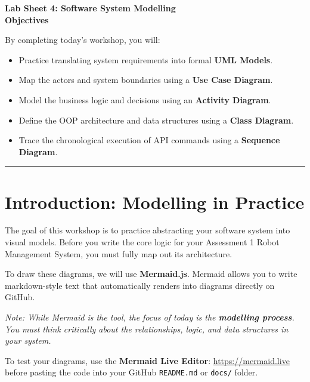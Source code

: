 \documentclass[a4paper,12pt]{article}
\begin{document}

\begin{center}
    \LARGE \textbf{Lab Sheet 4: Software System Modelling} \\
    \vspace{0.5cm}
    \large \textbf{Objectives}
\end{center}

\noindent By completing today's workshop, you will:
\begin{itemize}
    \item Practice translating system requirements into formal \textbf{UML Models}.
    \item Map the actors and system boundaries using a \textbf{Use Case Diagram}.
    \item Model the business logic and decisions using an \textbf{Activity Diagram}.
    \item Define the OOP architecture and data structures using a \textbf{Class Diagram}.
    \item Trace the chronological execution of API commands using a \textbf{Sequence Diagram}.
\end{itemize}

\vspace{0.5cm}
\hrule
\vspace{0.5cm}

\section*{Introduction: Modelling in Practice}
The goal of this workshop is to practice abstracting your software system into visual models. Before you write the core logic for your Assessment 1 Robot Management System, you must fully map out its architecture.

To draw these diagrams, we will use \textbf{Mermaid.js}. Mermaid allows you to write markdown-style text that automatically renders into diagrams directly on GitHub. 

\textit{Note: While Mermaid is the tool, the focus of today is the \textbf{modelling process}. You must think critically about the relationships, logic, and data structures in your system.}

To test your diagrams, use the \textbf{Mermaid Live Editor}: \href{https://mermaid.live}{https://mermaid.live} before pasting the code into your GitHub \texttt{README.md} or \texttt{docs/} folder.
\end{document}
